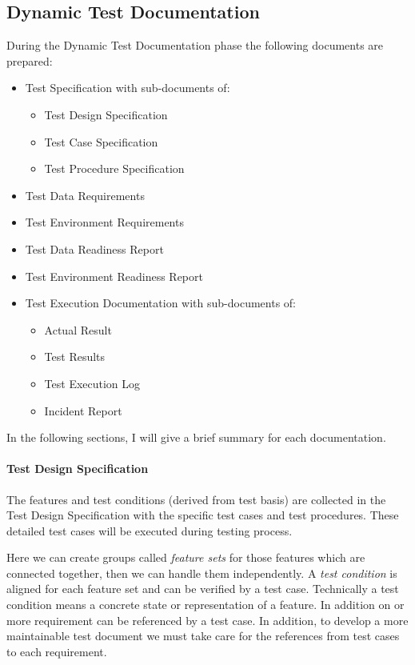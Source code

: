 \subsection{Dynamic Test Documentation}
During the Dynamic Test Documentation phase the following documents are prepared:
\begin{itemize}
	\item Test Specification with sub-documents of:
	\begin{itemize}
		\item Test Design Specification
		\item Test Case Specification
		\item Test Procedure Specification
	\end{itemize}
	\item Test Data Requirements
	\item Test Environment Requirements
	\item Test Data Readiness Report
	\item Test Environment Readiness Report
	\item Test Execution Documentation with sub-documents of:
	\begin{itemize}
		\item Actual Result
		\item Test Results
		\item Test Execution Log
		\item Incident Report
	\end{itemize}
\end{itemize}

In the following sections, I will give a brief summary for each documentation.

\paragraph{Test Design Specification} \label{TestDoc:TDS}
The features and test conditions (derived from test basis) are collected in the Test Design Specification with the specific test cases and test procedures. These detailed test cases will be executed during testing process. 

Here we can create groups called \textit{feature sets} for those features which are connected together, then we can handle them independently.  A \textit{test condition} is aligned for each feature set and can be verified by a test case. Technically a test condition means a concrete state or representation of a feature. In addition on or more requirement can be referenced by a test case. In addition, to develop a more maintainable test document we must take care for the references from test cases to each requirement.

